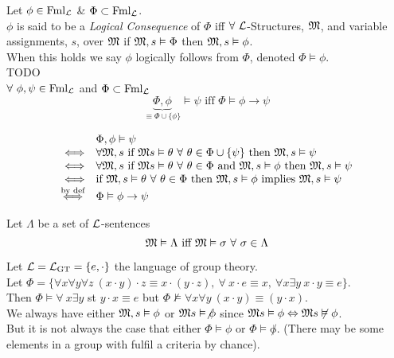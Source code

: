 \documentclass[11pt,a4paper]{article}
\begin{document}
Let $\phi\in\text{Fml}_{\mathcal{L}}$ \& $\Phi\subset\text{Fml}_{\mathcal{L}}$.\\
$\phi$ is said to be a \textit{Logical Consequence} of $\Phi$ iff $\forall\ \mathcal{L}$-Structures, $\mathfrak{M}$, and variable assignments, $s$, over $\mathfrak{M}$ if $\mathfrak{M},s\vDash\Phi$ then $\mathfrak{M},s\vDash\phi$.\\
\nb When this holds we say $\phi$ logically follows from $\Phi$, denoted $\Phi\vDash\phi$.\\

TODO\\

\proposition{}
$\forall\ \phi,\psi\in\text{Fml}_{\mathcal{L}}$ and $\Phi\subset\text{Fml}_{\mathcal{L}}$
$$\underbrace{\Phi,\phi}_{\equiv\Phi\cup\{\phi\}}\vDash\psi\text{ iff }\Phi\vDash\phi\to\psi$$

\[\begin{array}{rl}
&\Phi,\phi\vDash\psi\\
\Longleftrightarrow&\forall\M,s\text{ if }\M s\vDash\theta\ \forall\ \theta\in\Phi\cup\{\psi\}\text{ then }\M,s\vDash\psi\\
\Longleftrightarrow&\forall\M,s\text{ if }\M s\vDash\theta\ \forall\ \theta\in\Phi\text{ and }\M,s\vDash\phi\text{ then }\M,s\vDash\psi\\
\Longleftrightarrow&\text{if }\M,s\vDash\theta\ \forall\ \theta\in\Phi\text{ then }\M,s\vDash\phi\text{ implies }\M,s\vDash\psi\\
\overset{\text{by def}}{\Longleftrightarrow}&\Phi\vDash\phi\to\psi
\end{array}\]

Let $\Lambda$ be a set of $\mathcal{L}$-sentences
$$\M\vDash\Lambda\text{ iff }\M\vDash\sigma\ \forall\ \sigma\in\Lambda$$

\example{}
Let $\mathcal{L}=\mathcal{L}_\text{GT}=\{e,\cdot\}$ the language of group theory.\\
Let $\Phi=\{\forall x\forall y\forall z\ (x\cdot y)\cdot z\equiv x\cdot(y\cdot z),\ \forall\ x\cdot e\equiv x,\ \forall x\exists y\ x\cdot y\equiv e\}$.\\
Then $\Phi\vDash\forall\ x\exists y$ st $y\cdot x\equiv e$ but $\Phi\not\vDash\forall x\forall y\ (x\cdot y)\equiv(y\cdot x)$.\\

\remark{}
We always have either $\mathfrak{M},s\vDash\phi$ or $\mathfrak{M} s\vDash\not\phi$ since $\mathfrak{M} s\vDash\phi\Leftrightarrow\mathfrak{M} s\not\vDash\phi$.\\
But it is not always the case that either $\Phi\vDash\phi$ or $\Phi\vDash\not\phi$. (There may be some elements in a group with fulfil a criteria by chance).\\
\end{document}
